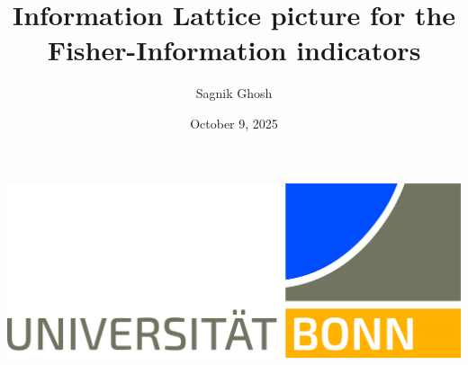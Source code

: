 \documentclass{amsproc}
\title{Information Lattice picture for the Fisher-Information indicators}                        %
\author{Sagnik Ghosh}
\date{October 9, 2025}            %
\begin{document}
\newtheorem{defn}[]{Definition}
\newtheorem{obs}[]{Observation}
\newtheorem{lem}[]{Lemma}
\newtheorem{thm}[]{Theorem}
\newtheorem{corr}[]{Corollary}
\newtheorem{conj}[]{Conjecture}
\newtheorem{prop}[]{Property}
\newtheorem{appr}[]{Approximation}
\newtheorem{claim}[]{Claim}
\newtheorem{notes}[]{Note}



\includegraphics[scale=0.03]{./.src/header/UNI_Bonn_Logo_Standard_RZ_Office.jpg}

\vspace{6mm}

\maketitle








\printbibliography


\end{document}
